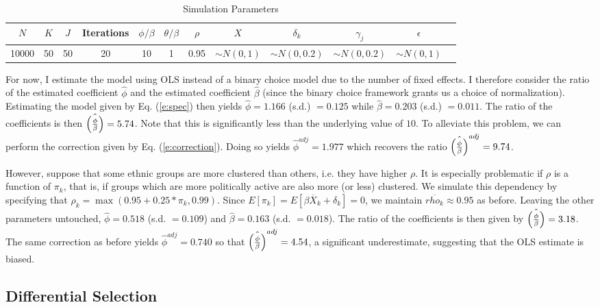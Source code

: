 \documentclass[11pt, oneside]{article}   	%
\begin{document}
\begin{table}[H] 
\centering 
\caption{Simulation Parameters} 
\begin{tabular}{*{12}c}
\toprule
$N$ & $K$ & $J$ & Iterations & $\phi/\beta$ & $\theta/\beta$ & $\rho$ & $X$ & $\delta_k$ & $\gamma_j$ & $\epsilon$  \\
\midrule
10000 & 50 & 50 & 20 & 10 & 1 & 0.95  & $\sim N(0,1)$ & $\sim N(0,0.2)$ & $\sim N(0,0.2)$ & $\sim N(0,1)$ \\
\bottomrule
\end{tabular}
\end{table}

For now, I estimate the model using OLS instead of a binary choice model due to the number of fixed effects. I therefore consider the ratio of the estimated coefficient $\hat\phi$ and the estimated coefficient $\hat \beta$ (since the binary choice framework grants us a choice of normalization). Estimating the model given by Eq. (\ref{e:spec}) then yields $\hat \phi = 1.166$ (s.d.) $=0.125$ while $\hat \beta = 0.203$ (s.d.) $=0.011$. The ratio of the coefficients is then $\hat{\qty(\frac{\phi}{\beta})} = 5.74$. Note that this is significantly less than the underlying value of $10$. To alleviate this problem, we can perform the correction given by Eq. (\ref{e:correction}). Doing so yields
$\hat\phi^{adj} = 1.977$ which recovers the ratio $\hat{\qty(\frac{\phi}{\beta})}^{adj} = 9.74$.

However, suppose that some ethnic groups are more clustered than others, i.e. they have higher $\rho$. It is especially problematic if $\rho$ is a function of $\pi_k$, that is, if groups which are more politically active are also more (or less) clustered. We simulate this dependency by specifying that $\rho_k = \max(0.95 + 0.25*\pi_k,0.99)$. Since $E[\pi_k]=E[\beta \overline{X}_k +\delta_k]=0$, we maintain $\overline{rho_k} \approx 0.95$ as before. Leaving the other parameters untouched, $\hat \phi = 0.518$ (s.d. $= 0.109$) and $\hat \beta = 0.163$ (s.d. $= 0.018$). The ratio of the coefficients is then given by $\hat{\qty(\frac{\phi}{\beta})}=3.18$. The same correction as before yields $\hat\phi^{adj} = 0.740$ so that $\hat{\qty(\frac{\phi}{\beta})}^{adj} = 4.54$, a significant underestimate, suggesting that the OLS estimate is biased. 


\subsection{Differential Selection}
\end{document}
